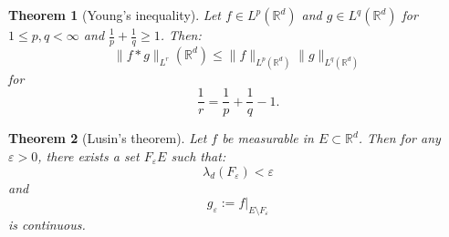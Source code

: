 \documentclass{article}
\newtheorem{theorem}{Theorem}
\theoremstyle{definition}
\numberwithin{theorem}{section}
\numberwithin{equation}{section}
\begin{document}
\begin{theorem}[Young's inequality]
	Let $ f \in L^p(\mathbb{R}^d)$ and $g \in L^q(\mathbb{R}^d)$ for $1 \leq p , q < \infty$ and $\frac{1}{p} + \frac{1}{q} \geq 1$. Then:
	\begin{equation}
		\| f \ast g \|_{L^r}(\mathbb{R}^d) \leq \| f \|_{L^p(\mathbb{R}^d)}\| g \|_{L^q(\mathbb{R}^d)}
	\end{equation}
	for 
	\begin{equation}
		\frac{1}{r} = \frac{1}{p} + \frac{1}{q} - 1.
	\end{equation}
	
\end{theorem}

\begin{theorem}[Lusin's theorem]
	Let $f$ be measurable in $E \subset \mathbb{R}^d$. Then for any $\varepsilon > 0$, there exists a set $F_\varepsilon E$ such that:
	\begin{equation}
		\lambda_d(F_\varepsilon) < \varepsilon
	\end{equation}
	and
	\begin{equation}
		g_\varepsilon := f|_{E\setminus F_\varepsilon}
	\end{equation}
	is continuous. 
\end{theorem}
\end{document}
